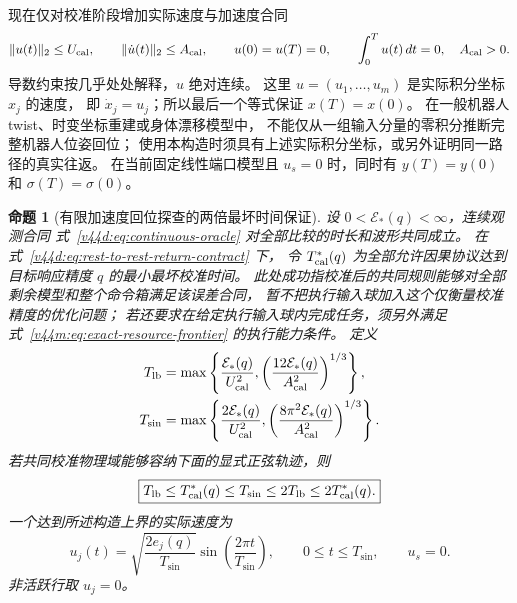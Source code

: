 \documentclass[11pt,a4paper]{article}
\numberwithin{equation}{section}
\newtheorem{proposition}[theorem]{命题}
\theoremstyle{definition}
\begin{document}
现在仅对校准阶段增加实际速度与加速度合同
\begin{equation}
 \|u(t)\|_2\le U_{\rm cal},\qquad
 \|\dot u(t)\|_2\le A_{\rm cal},\qquad
 u(0)=u(T)=0,\qquad \int_0^T u(t)\,dt=0,
 \quad A_{\rm cal}>0.
 \label{v44d:eq:rest-to-rest-return-contract}
\end{equation}
导数约束按几乎处处解释，$u$ 绝对连续。
这里 $u=(u_1,\ldots,u_m)$ 是实际积分坐标 $x_j$ 的速度，
即 $\dot x_j=u_j$；所以最后一个等式保证 $x(T)=x(0)$。
在一般机器人 twist、时变坐标重建或身体漂移模型中，
不能仅从一组输入分量的零积分推断完整机器人位姿回位；
使用本构造时须具有上述实际积分坐标，或另外证明同一路径的真实往返。
在当前固定线性端口模型且 $u_s=0$ 时，同时有 $y(T)=y(0)$ 和 $\sigma(T)=\sigma(0)$。

\begin{proposition}[有限加速度回位探查的两倍最坏时间保证]
\label{v44d:prop:sine-two-approximation}
设 $0<\mathcal E_*(q)<\infty$，连续观测合同
式~\eqref{v44d:eq:continuous-oracle} 对全部比较的时长和波形共同成立。
在式~\eqref{v44d:eq:rest-to-rest-return-contract} 下，
令 $T_{\rm cal}^*(q)$ 为全部允许因果协议达到目标响应精度 $q$ 的最小最坏校准时间。
此处成功指校准后的共同规则能够对全部剩余模型和整个命令箱满足该误差合同，
暂不把执行输入球加入这个仅衡量校准精度的优化问题；
若还要求在给定执行输入球内完成任务，须另外满足
式~\eqref{v44m:eq:exact-resource-frontier} 的执行能力条件。
定义
\begin{align}
 T_{\rm lb}
 &=\max\left\{
 \frac{\mathcal E_*(q)}{U_{\rm cal}^2},
 \left(\frac{12\mathcal E_*(q)}{A_{\rm cal}^2}\right)^{1/3}
 \right\},\label{v44d:eq:acceleration-time-lower}\\
 T_{\sin}
 &=\max\left\{
 \frac{2\mathcal E_*(q)}{U_{\rm cal}^2},
 \left(\frac{8\pi^2\mathcal E_*(q)}{A_{\rm cal}^2}\right)^{1/3}
 \right\}.\label{v44d:eq:sine-duration}
\end{align}
若共同校准物理域能够容纳下面的显式正弦轨迹，则
\begin{equation}
 \boxed{
 T_{\rm lb}\le T_{\rm cal}^*(q)\le T_{\sin}
 \le2T_{\rm lb}\le2T_{\rm cal}^*(q).}
 \label{v44d:eq:factor-two-time}
\end{equation}
一个达到所述构造上界的实际速度为
\begin{equation}
 u_j(t)=\sqrt{\frac{2e_j(q)}{T_{\sin}}}
          \sin\left(\frac{2\pi t}{T_{\sin}}\right),
 \qquad 0\le t\le T_{\sin},\qquad u_s=0.
 \label{v44d:eq:sine-returning-probe}
\end{equation}
非活跃行取 $u_j=0$。
\end{proposition}
\end{document}

